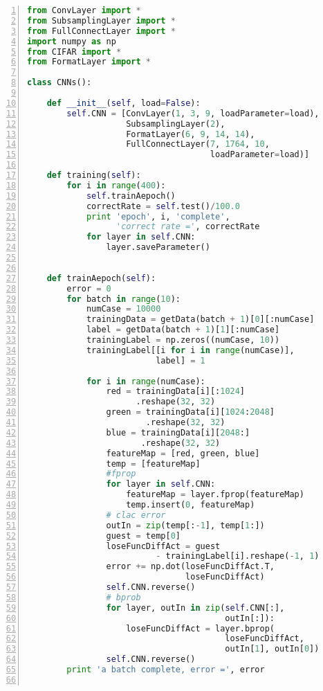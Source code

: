 \newpage

\begin{lstlisting}[language=Python,numbers=left, frame=shadowbox, rulesepcolor=\color{cadegrey}, caption=\text{CNNs.py}]
from ConvLayer import *
from SubsamplingLayer import *
from FullConnectLayer import *
import numpy as np
from CIFAR import *
from FormatLayer import *

class CNNs():
    
    def __init__(self, load=False):
        self.CNN = [ConvLayer(1, 3, 9, loadParameter=load),
                    SubsamplingLayer(2),  
                    FormatLayer(6, 9, 14, 14),
                    FullConnectLayer(7, 1764, 10, 
                                     loadParameter=load)]
    
    def training(self):
        for i in range(400):
            self.trainAepoch()
            correctRate = self.test()/100.0
            print 'epoch', i, 'complete', 
                  'correct rate =', correctRate
            for layer in self.CNN:
                layer.saveParameter()

    
    def trainAepoch(self):
        error = 0
        for batch in range(10):
            numCase = 10000
            trainingData = getData(batch + 1)[0][:numCase]
            label = getData(batch + 1)[1][:numCase]
            trainingLabel = np.zeros((numCase, 10))
            trainingLabel[[i for i in range(numCase)], 
                          label] = 1
    
            for i in range(numCase):
                red = trainingData[i][:1024]
                      .reshape(32, 32)
                green = trainingData[i][1024:2048]
                        .reshape(32, 32)
                blue = trainingData[i][2048:]
                       .reshape(32, 32)
                featureMap = [red, green, blue]
                temp = [featureMap]
                #fprop
                for layer in self.CNN:
                    featureMap = layer.fprop(featureMap)
                    temp.insert(0, featureMap)
                # clac error
                outIn = zip(temp[:-1], temp[1:])
                guest = temp[0]
                loseFuncDiffAct = guest 
                          - trainingLabel[i].reshape(-1, 1)
                error += np.dot(loseFuncDiffAct.T, 
                                loseFuncDiffAct)
                self.CNN.reverse()
                # bprob
                for layer, outIn in zip(self.CNN[:], 
                                        outIn[:]):
                    loseFuncDiffAct = layer.bprop(
                                        loseFuncDiffAct, 
                                        outIn[1], outIn[0])
                self.CNN.reverse()
        print 'a batch complete, error =', error
    

\end{lstlisting}
